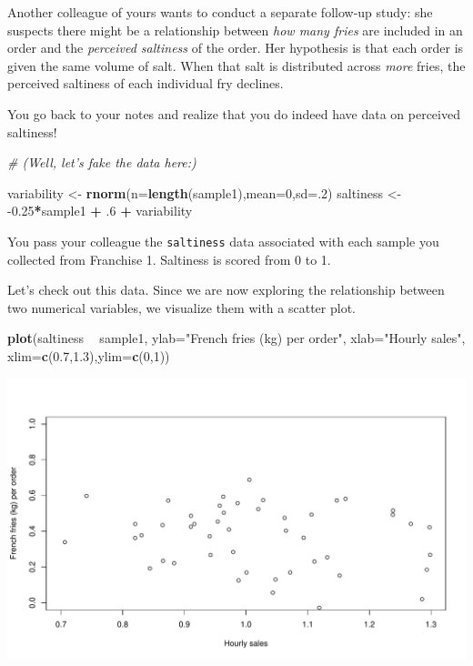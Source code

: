 \documentclass[
]{book}
\newenvironment{Shaded}{\begin{snugshade}}{\end{snugshade}}
\newcommand{\CommentTok}[1]{\textcolor[rgb]{0.56,0.35,0.01}{\textit{#1}}}
\newcommand{\DataTypeTok}[1]{\textcolor[rgb]{0.13,0.29,0.53}{#1}}
\newcommand{\DecValTok}[1]{\textcolor[rgb]{0.00,0.00,0.81}{#1}}
\newcommand{\FloatTok}[1]{\textcolor[rgb]{0.00,0.00,0.81}{#1}}
\newcommand{\KeywordTok}[1]{\textcolor[rgb]{0.13,0.29,0.53}{\textbf{#1}}}
\newcommand{\NormalTok}[1]{#1}
\newcommand{\OperatorTok}[1]{\textcolor[rgb]{0.81,0.36,0.00}{\textbf{#1}}}
\newcommand{\StringTok}[1]{\textcolor[rgb]{0.31,0.60,0.02}{#1}}
\begin{document}
Another colleague of yours wants to conduct a separate follow-up study: she suspects there might be a relationship between \emph{how many fries} are included in an order and the \emph{perceived saltiness} of the order. Her hypothesis is that each order is given the same volume of salt. When that salt is distributed across \emph{more} fries, the perceived saltiness of each individual fry declines.

You go back to your notes and realize that you do indeed have data on perceived saltiness!

\begin{Shaded}
\begin{Highlighting}[]
\CommentTok{# (Well, let's fake the data here:)}

\NormalTok{variability <-}\StringTok{ }\KeywordTok{rnorm}\NormalTok{(}\DataTypeTok{n=}\KeywordTok{length}\NormalTok{(sample1),}\DataTypeTok{mean=}\DecValTok{0}\NormalTok{,}\DataTypeTok{sd=}\NormalTok{.}\DecValTok{2}\NormalTok{)}
\NormalTok{saltiness <-}\StringTok{ }\FloatTok{-0.25}\OperatorTok{*}\NormalTok{sample1 }\OperatorTok{+}\StringTok{ }\FloatTok{.6} \OperatorTok{+}\StringTok{ }\NormalTok{variability}
\end{Highlighting}
\end{Shaded}

You pass your colleague the \texttt{saltiness} data associated with each sample you collected from Franchise 1. Saltiness is scored from 0 to 1.

Let's check out this data. Since we are now exploring the relationship between two numerical variables, we visualize them with a scatter plot.

\begin{Shaded}
\begin{Highlighting}[]
\KeywordTok{plot}\NormalTok{(saltiness }\OperatorTok{~}\StringTok{ }\NormalTok{sample1,}
     \DataTypeTok{ylab=}\StringTok{"French fries (kg) per order"}\NormalTok{,}
     \DataTypeTok{xlab=}\StringTok{"Hourly sales"}\NormalTok{,}
     \DataTypeTok{xlim=}\KeywordTok{c}\NormalTok{(}\FloatTok{0.7}\NormalTok{,}\FloatTok{1.3}\NormalTok{),}\DataTypeTok{ylim=}\KeywordTok{c}\NormalTok{(}\DecValTok{0}\NormalTok{,}\DecValTok{1}\NormalTok{))}
\end{Highlighting}
\end{Shaded}

\includegraphics{figures/unnamed-chunk-192-1.pdf}
\end{document}
